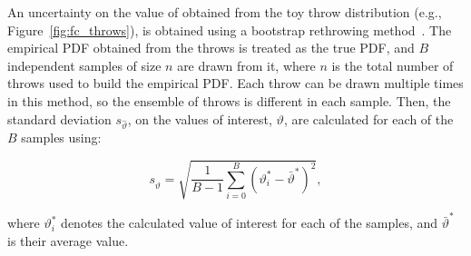 An uncertainty on the value of \dchisqcrit obtained from the toy throw distribution (e.g., Figure~\ref{fig:fc_throws}), is obtained using a bootstrap rethrowing method~\cite{rice2006mathematical}. The empirical PDF obtained from the throws is treated as the true PDF, and $B$ independent samples of size $n$ are drawn from it, where $n$ is the total number of throws used to build the empirical PDF. Each throw can be drawn multiple times in this method, so the ensemble of throws is different in each sample. Then, the standard deviation $s_{\hat{\vartheta}}$, on the \dchisqcrit values of interest, $\vartheta$, are calculated for each of the $B$ samples using:
\begin{linenomath*}
\begin{equation}
  s_{\hat{\vartheta}} = \sqrt{\frac{1}{B-1} \sum^{B}_{i=0} (\vartheta_{i}^{*} - \bar{\vartheta}^{*})^{2}},
  \label{eq:fc_uncertainty}
\end{equation}
\end{linenomath*}
where $\vartheta_{i}^{*}$ denotes the calculated \dchisqcrit value of interest for each of the samples, and $\bar{\vartheta}^{*}$ is their average value.

